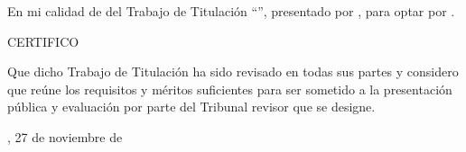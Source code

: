 
En mi calidad de \UTITutorEtiqueta{} del Trabajo de Titulación ``\UTITituloProyectoMayusculas'', presentado por \UTIAutoresTexto, para optar por \UTIFraseTituloProfesional{}.

\begin{center}
CERTIFICO
\end{center}

Que dicho Trabajo de Titulación ha sido revisado en todas sus partes y considero que reúne los requisitos y méritos suficientes para ser sometido a la presentación pública y evaluación por parte del Tribunal revisor que se designe.

\vspace{1.5cm}

{\raggedleft
\UTICiudadPais, 27 de noviembre de \UTIAnio\par}

\vspace{2.5cm}

\UTIFirmaTutorBloque
